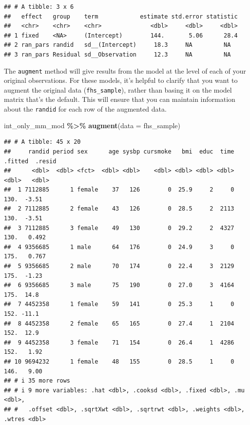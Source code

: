 \documentclass[
]{book}
\newenvironment{Shaded}{\begin{snugshade}}{\end{snugshade}}
\newcommand{\AttributeTok}[1]{\textcolor[rgb]{0.13,0.29,0.53}{#1}}
\newcommand{\FunctionTok}[1]{\textcolor[rgb]{0.13,0.29,0.53}{\textbf{#1}}}
\newcommand{\NormalTok}[1]{#1}
\newcommand{\SpecialCharTok}[1]{\textcolor[rgb]{0.81,0.36,0.00}{\textbf{#1}}}
\begin{document}
\begin{verbatim}
## # A tibble: 3 x 6
##   effect   group    term            estimate std.error statistic
##   <chr>    <chr>    <chr>              <dbl>     <dbl>     <dbl>
## 1 fixed    <NA>     (Intercept)        144.       5.06      28.4
## 2 ran_pars randid   sd__(Intercept)     18.3     NA         NA  
## 3 ran_pars Residual sd__Observation     12.3     NA         NA
\end{verbatim}

The \texttt{augment} method will give results from the model at the level of each of your
original observations. For these models, it's helpful to clarify that you want
to augment the original data (\texttt{fhs\_sample}), rather than basing it on the model
matrix that's the default. This will ensure that you can maintain information about
the \texttt{randid} for each row of the augmented data.

\begin{Shaded}
\begin{Highlighting}[]
\NormalTok{int\_only\_mm\_mod }\SpecialCharTok{\%\textgreater{}\%} 
  \FunctionTok{augment}\NormalTok{(}\AttributeTok{data =}\NormalTok{ fhs\_sample)}
\end{Highlighting}
\end{Shaded}

\begin{verbatim}
## # A tibble: 45 x 20
##     randid period sex      age sysbp cursmoke   bmi  educ  time .fitted  .resid
##      <dbl>  <dbl> <fct>  <dbl> <dbl>    <dbl> <dbl> <dbl> <dbl>   <dbl>   <dbl>
##  1 7112885      1 female    37   126        0  25.9     2     0    130.  -3.51 
##  2 7112885      2 female    43   126        0  28.5     2  2113    130.  -3.51 
##  3 7112885      3 female    49   130        0  29.2     2  4327    130.   0.492
##  4 9356685      1 male      64   176        0  24.9     3     0    175.   0.767
##  5 9356685      2 male      70   174        0  22.4     3  2129    175.  -1.23 
##  6 9356685      3 male      75   190        0  27.0     3  4164    175.  14.8  
##  7 4452358      1 female    59   141        0  25.3     1     0    152. -11.1  
##  8 4452358      2 female    65   165        0  27.4     1  2104    152.  12.9  
##  9 4452358      3 female    71   154        0  26.4     1  4286    152.   1.92 
## 10 9694232      1 female    48   155        0  28.5     1     0    146.   9.00 
## # i 35 more rows
## # i 9 more variables: .hat <dbl>, .cooksd <dbl>, .fixed <dbl>, .mu <dbl>,
## #   .offset <dbl>, .sqrtXwt <dbl>, .sqrtrwt <dbl>, .weights <dbl>, .wtres <dbl>
\end{verbatim}
\end{document}
